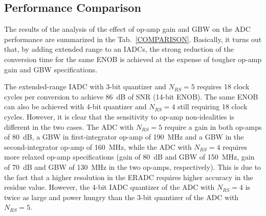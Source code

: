 \subsection{Performance Comparison}
The results of the analysis of the effect of op-amp gain and GBW on the ADC performance are summarized in the Tab.~\ref{COMPARISON}. Basically, it turns out that, by adding extended range to an IADCs, the strong reduction of the conversion time for the same ENOB is achieved at the expense of tougher op-amp gain and GBW specifications.
\begin{table}
\centering
{}
\caption{Comparison of the op-amp requirements for standalone IADC and extended-range IADC}
\label{COMPARISON}
\end{table}
The extended-range IADC with 3-bit quantizer and $N_{RS}=5$ requires 18 clock cycles per conversion to achieve 86~dB of SNR (14-bit ENOB). The same ENOB can also be achieved with 4-bit quantizer and $N_{RS}=4$ still requiring 18 clock cycles. However, it is clear that the sensitivity to op-amp non-idealities is different in the two cases. The ADC with $N_{RS}=5$ require a gain in both op-amps of 80~dB, a GBW in first-integrator op-amp of 190~MHz and a GBW in the second-integrator op-amp of 160~MHz, while the ADC with $N_{RS}=4$ requires more relaxed op-amp specifications (gain of 80~dB and GBW of 150~MHz, gain of 70~dB and GBW of 130~MHz in the two op-amps, respectively). This is due to the fact that a higher resolution in the ERADC requires higher accuracy in the residue value. However, the 4-bit IADC quantizer of the ADC with $N_{RS}=4$ is twice as large and power hungry than the 3-bit quantizer of the ADC with $N_{RS}=5$.

